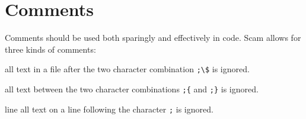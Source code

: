 \chapter{Comments}
\label{Comments}

Comments should be used both sparingly and effectively in code.
Scam allows for three kinds of comments:

\begin{description}
\item[file]
    all text in a file after the
    two character combination \verb!;\$! is ignored.
\item[block]
    all text between the
    two character combinations \verb!;{! and \verb!;}! is ignored.
\item
    line all text on a line following the character \verb!;! is ignored.
\end{description}
